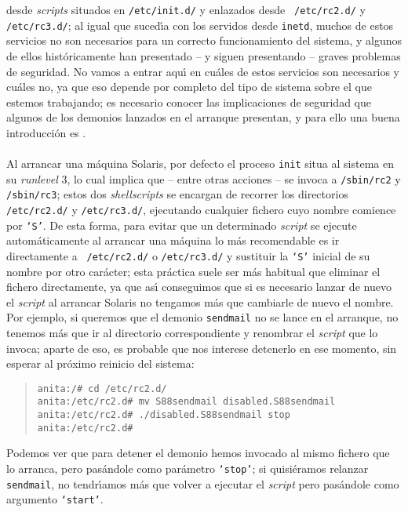 desde {\it scripts} situados en {\tt /etc/init.d/} y enlazados desde {\tt 
/etc/rc2.d/} y {\tt /etc/rc3.d/}; al igual que suced\'{\i}a con los servidos 
desde {\tt inetd}, muchos de estos servicios no son necesarios 
para un correcto funcionamiento del sistema, y algunos de ellos 
hist\'oricamente han presentado -- y siguen presentando -- graves problemas de 
seguridad. No vamos a entrar aqu\'{\i} en cu\'ales de estos servicios son
necesarios y cu\'ales no, ya que eso depende por completo del tipo de sistema
sobre el que estemos trabajando; es necesario conocer las implicaciones de
seguridad que algunos de los demonios lanzados en el arranque presentan, y para 
ello una buena introducci\'on es \cite{kn:fly00a}.\\
\\Al arrancar una m\'aquina Solaris, por defecto el proceso {\tt init} situa al
sistema en su {\it runlevel} 3, lo cual implica que -- entre otras acciones -- 
se invoca a {\tt /sbin/rc2} y {\tt /sbin/rc3}; estos dos {\it shellscripts} se
encargan de recorrer los directorios {\tt /etc/rc2.d/} y {\tt /etc/rc3.d/}, 
ejecutando cualquier fichero cuyo nombre comience por {\tt `S'}. De esta forma,
para evitar que un determinado {\it script} se ejecute autom\'aticamente al
arrancar una m\'aquina lo m\'as recomendable es ir directamente a {\tt 
/etc/rc2.d/} o {\tt /etc/rc3.d/} y sustituir la {\tt `S'} inicial de su nombre
por otro car\'acter; esta pr\'actica suele ser m\'as habitual que eliminar el
fichero directamente, ya que as\'{\i} conseguimos que si es necesario lanzar
de nuevo el {\it script} al arrancar Solaris no tengamos m\'as que cambiarle de
nuevo el nombre. Por ejemplo, si queremos que el demonio {\tt sendmail} no se 
lance en el arranque, no tenemos m\'as que ir al directorio correspondiente y
renombrar el {\it script} que lo invoca; aparte de eso, es probable que nos 
interese detenerlo en ese momento, sin esperar al pr\'oximo reinicio del 
sistema:
\begin{quote}
\begin{verbatim}
anita:/# cd /etc/rc2.d/
anita:/etc/rc2.d# mv S88sendmail disabled.S88sendmail
anita:/etc/rc2.d# ./disabled.S88sendmail stop
anita:/etc/rc2.d# 
\end{verbatim}
\end{quote}
Podemos ver que para detener el demonio hemos invocado al mismo fichero que
lo arranca, pero pas\'andole como par\'ametro {\tt `stop'}; si quisi\'eramos
relanzar {\tt sendmail}, no tendr\'{\i}amos m\'as que volver a ejecutar el
{\it script} pero pas\'andole como argumento {\tt `start'}.
